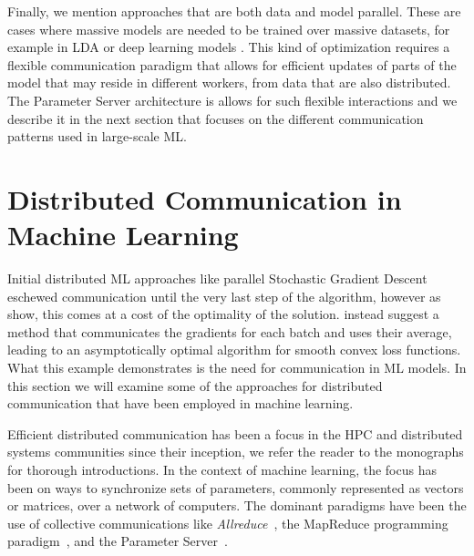 Finally, we mention approaches that are both data and model parallel. These are
cases where massive models are needed to be trained over massive datasets, for
example in LDA or deep learning models \cite{large-scale-dl, lightLDA}. This kind of
optimization requires a flexible communication paradigm that allows for efficient
updates of parts of the model that may reside in different workers, from data
that are also distributed. The Parameter Server architecture\cite{muPS} is
allows for such flexible interactions and we describe it in the next
section that focuses on the different communication patterns used
in large-scale ML.

\section{Distributed Communication in Machine Learning}
\label{sec:bg-ml-communication}

Initial distributed ML approaches like parallel Stochastic Gradient Descent
\cite{parallel-sgd} eschewed communication until the very last step of the
algorithm, however as \citet{dekel-optimal-distributed} show, this comes
at a cost of the optimality of the solution. \citet{dekel-optimal-distributed}
instead suggest a method that communicates the gradients for each batch and uses
their average, leading to an asymptotically optimal algorithm for smooth
convex loss functions. What this example demonstrates is the need for communication
in ML models. In this section we will examine some of the approaches for distributed
communication that have been employed in machine learning.

Efficient distributed communication has been a focus in the HPC and distributed systems
communities since their inception, we refer the reader to the monographs
\cite{hpc-intro, distributed-systems-book, distributed-systems-programming, distributed-systems-computation} for thorough introductions.
In the context of machine learning, the focus has been on ways to synchronize
sets of parameters, commonly represented as vectors or matrices, over a network
of computers. The dominant paradigms have been the use of collective communications
like \emph{Allreduce}~\cite{allreduce}, the MapReduce programming paradigm~\cite{mapreduce},
and the Parameter Server~\cite{muPS}.

